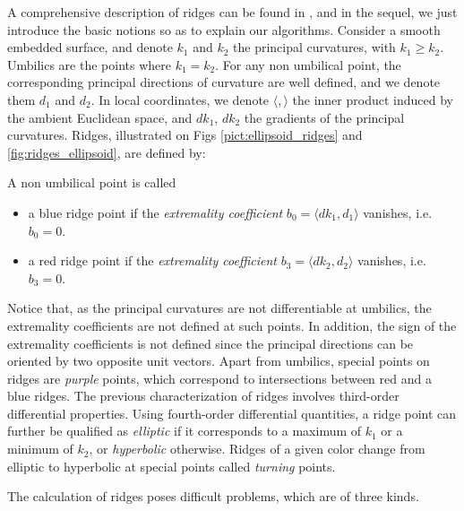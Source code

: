 A comprehensive description of ridges can be found in
\cite{ip-nss-71,hgyg-ttdpf-99,ip-gd-01}, and in the sequel, we just
introduce the basic notions so as to explain our algorithms.
Consider a smooth embedded surface, and denote $k_1$ and $k_2$ the
principal curvatures, with $k_1\geq k_2$. Umbilics are the points
where $k_1=k_2$.  For any non umbilical point, the corresponding
principal directions of curvature are well defined, and we denote them
$d_1$ and $d_2$. In local coordinates, we denote $\langle , \rangle$
the inner product induced by the ambient Euclidean space, and $dk_1$,
$dk_2$ the gradients of the principal curvatures. Ridges, illustrated
on Figs \ref{pict:ellipsoid_ridges} and \ref{fig:ridges_ellipsoid},
are defined by:
\begin{definition}
\label{def:ridge-extrema}
A non umbilical point is called
\begin{itemize}
\item
a blue ridge point if the {\em extremality coefficient} $b_0=\langle
dk_1,d_1 \rangle$ vanishes, i.e. $b_0=0$.

\item
a red ridge point if the {\em extremality coefficient} $b_3=\langle
dk_2,d_2 \rangle$ vanishes, i.e. $b_3=0$.

\end{itemize}
\end{definition}
Notice that, as the principal curvatures are not differentiable at
umbilics, the extremality coefficients are not defined at such
points. In addition, the sign of the extremality coefficients is not
defined since the principal directions can be oriented by two opposite
unit vectors. Apart from umbilics, special points on ridges are {\em
purple} points, which correspond to intersections between red and a
blue ridges. The previous characterization of ridges involves
third-order differential properties. Using fourth-order differential
quantities, a ridge point can further be qualified as {\em elliptic}
if it corresponds to a maximum of $k_1$ or a minimum of $k_2$, or {\em
hyperbolic} otherwise. Ridges of a given color change from elliptic to
hyperbolic at special points called {\em turning} points.

The calculation of ridges poses difficult problems, which are of three
kinds.

